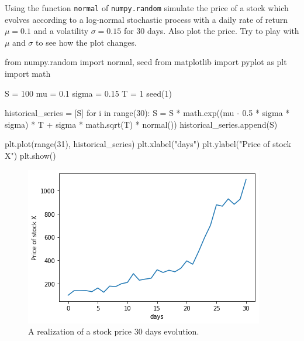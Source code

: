 \begin{question}
Using the function \texttt{normal} of \texttt{numpy.random} simulate the price of a stock which evolves according to a log-normal stochastic process with a daily rate of return \(\mu=0.1\) and a volatility \(\sigma=0.15\) for 30 days.
Also plot the price. Try to play with \(\mu\) and \(\sigma\) to see how the plot changes.
\end{question}

\cprotEnv\begin{solution}
\begin{ipython}
from numpy.random import normal, seed
from matplotlib import pyplot as plt
import math

S = 100
mu = 0.1
sigma = 0.15
T = 1
seed(1)

historical_series = [S]
for i in range(30):
    S = S * math.exp((mu - 0.5 * sigma * sigma) * T +
        sigma * math.sqrt(T) * normal())
    historical_series.append(S)

plt.plot(range(31), historical_series)
plt.xlabel("days")
plt.ylabel("Price of stock X")
plt.show()
\end{ipython}

\begin{figure}[htbp]
\begin{center}
  \includegraphics[width=0.7\linewidth]{figures/lesson6_solutions_5_0.png}
\end{center}
\caption{A realization of a stock price 30 days evolution.} 
\end{figure}
\end{solution}
